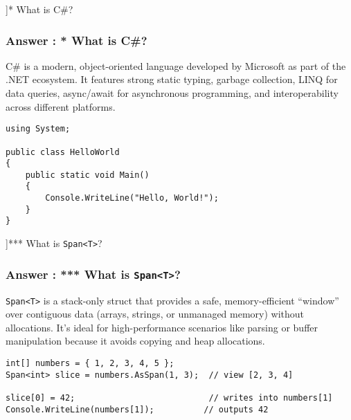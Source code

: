 \QuestionSlide[\CategoryBadge[OOPColor!20]{Language \& Platform}]{* What is C\#?}
\begin{frame}[fragile]
  \frametitle{Answer \theqcounter: * What is C\#?}


  {\footnotesize
    C\# is a modern, object-oriented language developed by Microsoft as part of the .NET ecosystem. It features strong static typing, garbage collection, LINQ for data queries, async/await for asynchronous programming, and interoperability across different platforms.
  }

  \begin{verbatim}
using System;

public class HelloWorld
{
    public static void Main()
    {
        Console.WriteLine("Hello, World!");
    }
}
  \end{verbatim}
\end{frame}

\QuestionSlide[\CategoryBadge[PerfColor!20]{Performance}]{*** What is \texttt{Span<T>}?}
\begin{frame}[fragile]
  \frametitle{Answer \theqcounter: *** What is \texttt{Span<T>}?}


  {\footnotesize
    \texttt{Span<T>} is a stack-only struct that provides a safe, memory-efficient “window” over contiguous data (arrays, strings, or unmanaged memory) without allocations. It’s ideal for high-performance scenarios like parsing or buffer manipulation because it avoids copying and heap allocations.
  }

  \begin{verbatim}
int[] numbers = { 1, 2, 3, 4, 5 };
Span<int> slice = numbers.AsSpan(1, 3);  // view [2, 3, 4]

slice[0] = 42;                           // writes into numbers[1]
Console.WriteLine(numbers[1]);          // outputs 42
  \end{verbatim}
\end{frame}

